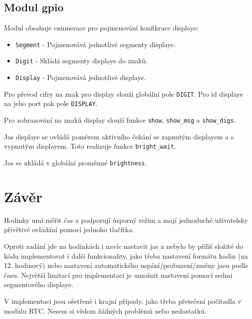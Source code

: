 \documentclass{article}
\begin{document}
\subsection{Modul gpio}

Modul obsahuje enumerace pro pojmenování konfikrace displaye:
\begin{itemize}
    \item \verb|Segment| - Pojmenovává jednotlivé segmenty displaye.
    \item \verb|Digit| - Skládá segmenty displaye do znaků.
    \item \verb|Display| - Pojmenovává jednotlivé displaye.
\end{itemize}

Pro převod cifry na znak pro display slouží globální pole \verb|DIGIT|. Pro id
displaye na jeho port pak pole \verb|DISPLAY|.

Pro zobrazování na znaků display slouží funkce \verb|show|, \verb|show_msg| a
\verb|show_digs|.

Jas displaye se ovládá poměrem aktivního čekání se zapnutým displayem a s
vypnutým displayem. Toto realizuje funkce \verb|bright_wait|.

Jas se ukládá v globální proměnné \verb|brightness|.

\section{Závěr}

Hodinky umí měřit čas a podporují úsporný režim a mají jednoduché uživatelsky
přívětivé ovládání pomocí jednoho tlačítka.

Oproti zadání jde na hodinkách i navíc nastavit jas a nebylo by příliš složité
do kódu implementovat i další funkcionality, jako třeba nastavení formátu hadin
(na 12. hodinový) nebo nastavení automatického uspání/probuzení/změny jasu
podle času. Největší limitací pro implementaci je umožnit nastavení pomocí
sedmi segmentového displaye.

V implementaci jsou ošetřené i krajní případy, jako třeba přetečení počítadla
v modulu RTC. Nesem si vědom žádných problémů nebo nedostatků.
\end{document}
